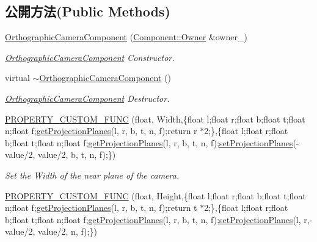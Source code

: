 \subsection*{公開方法(Public Methods)}
\begin{DoxyCompactItemize}
\item 
\hyperlink{class_i_dream_sky_1_1_orthographic_camera_component_a0f44d5eef1e6d2da9ffd83815e357f8e}{Orthographic\+Camera\+Component} (\hyperlink{class_i_dream_sky_1_1_component_1_1_owner}{Component\+::\+Owner} \&owner\+\_\+)
\begin{DoxyCompactList}\small\item\em \hyperlink{class_i_dream_sky_1_1_orthographic_camera_component}{Orthographic\+Camera\+Component} Constructor. \end{DoxyCompactList}\item 
virtual \hyperlink{class_i_dream_sky_1_1_orthographic_camera_component_a10165141f6f076d9a488f3ac9f7f644e}{$\sim$\+Orthographic\+Camera\+Component} ()
\begin{DoxyCompactList}\small\item\em \hyperlink{class_i_dream_sky_1_1_orthographic_camera_component}{Orthographic\+Camera\+Component} Destructor. \end{DoxyCompactList}\item 
\hyperlink{class_i_dream_sky_1_1_orthographic_camera_component_a33af978852c9fa825e7707a5b85bf744}{P\+R\+O\+P\+E\+R\+T\+Y\+\_\+\+C\+U\+S\+T\+O\+M\+\_\+\+F\+U\+NC} (float, Width,\{float l;float r;float b;float t;float n;float f;\hyperlink{class_i_dream_sky_1_1_camera_component_af5d94dcadd4011e3a0dad972c8eadd9b}{get\+Projection\+Planes}(l, r, b, t, n, f);return r $\ast$2;\},\{float l;float r;float b;float t;float n;float f;\hyperlink{class_i_dream_sky_1_1_camera_component_af5d94dcadd4011e3a0dad972c8eadd9b}{get\+Projection\+Planes}(l, r, b, t, n, f);\hyperlink{class_i_dream_sky_1_1_camera_component_ab50fcc345c5beb14317b4bb74f6c2b2e}{set\+Projection\+Planes}(-\/value/2, value/2, b, t, n, f);\})
\begin{DoxyCompactList}\small\item\em Set the Width of the near plane of the camera. \end{DoxyCompactList}\item 
\hyperlink{class_i_dream_sky_1_1_orthographic_camera_component_acb008ea72ed33baeff26a9e7cf4a0285}{P\+R\+O\+P\+E\+R\+T\+Y\+\_\+\+C\+U\+S\+T\+O\+M\+\_\+\+F\+U\+NC} (float, Height,\{float l;float r;float b;float t;float n;float f;\hyperlink{class_i_dream_sky_1_1_camera_component_af5d94dcadd4011e3a0dad972c8eadd9b}{get\+Projection\+Planes}(l, r, b, t, n, f);return t $\ast$2;\},\{float l;float r;float b;float t;float n;float f;\hyperlink{class_i_dream_sky_1_1_camera_component_af5d94dcadd4011e3a0dad972c8eadd9b}{get\+Projection\+Planes}(l, r, b, t, n, f);\hyperlink{class_i_dream_sky_1_1_camera_component_ab50fcc345c5beb14317b4bb74f6c2b2e}{set\+Projection\+Planes}(l, r,-\/value/2, value/2, n, f);\})

\end{DoxyCompactItemize}
